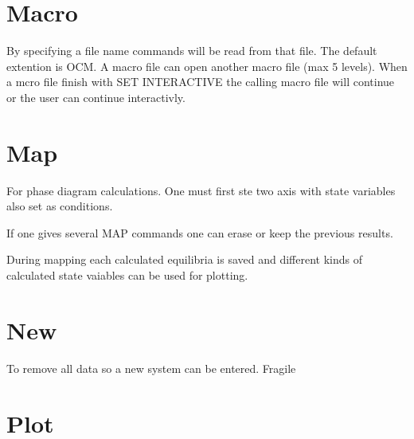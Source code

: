 \documentclass[12pt]{article}
\begin{document}
\section{Macro }

By specifying a file name commands will be read from that file.  The
default extention is OCM.  A macro file can open another macro file
(max 5 levels).  When a mcro file finish with SET INTERACTIVE the
calling macro file will continue or the user can continue
interactivly.

\section{Map }

For phase diagram calculations.  One must first ste two axis with
state variables also set as conditions.

If one gives several MAP commands one can erase or keep the previous
results.

During mapping each calculated equilibria is saved and different kinds
of calculated state vaiables can be used for plotting.

\section{New }

To remove all data so a new system can be entered.  Fragile

\section{Plot }
\end{document}
